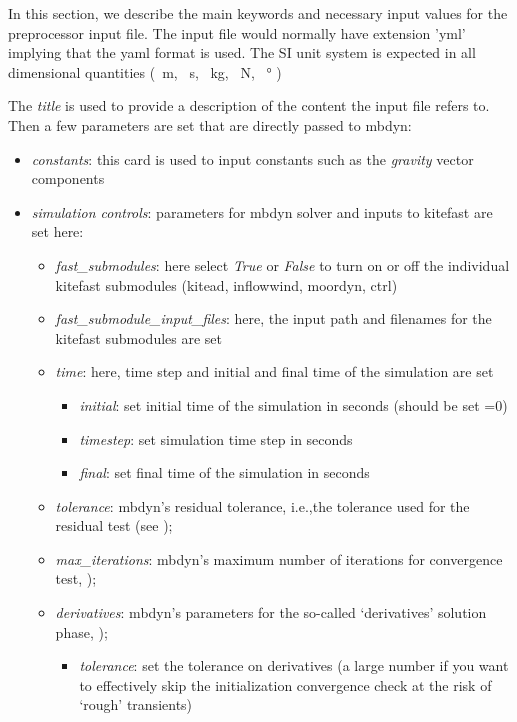 \documentclass[report]{nrel}
\def\ie{i.e., }
\def\ie{i.e.,}
\begin{document}
In this section, we describe the main keywords and necessary input values for the preprocessor input file. The input file would normally have extension 'yml' implying that the \gls{yaml} format is used. The SI unit system is expected in all dimensional quantities (\SI{}{\m}, \SI{}{\s}, \SI{}{\kg}, \SI{}{\N}, \SI{}{\degree} )

The \emph{title} is used to provide a description of the content the input file refers to.
Then a few parameters are set that are directly passed to \gls{mbdyn}:
\begin{itemize}
	\item \emph{constants}: this card is used to input constants such as the \emph{gravity} vector components
%	
	\item \emph{simulation controls}: parameters for \gls{mbdyn} solver and inputs to \gls{kitefast} are set here:
%
	\begin{itemize}
		\item \emph{fast\_submodules}: here select \emph{True} or \emph{False} to turn on or off the individual \gls{kitefast} submodules (\gls{kitead}, \gls{inflowwind}, \gls{moordyn}, \gls{ctrl})
		\item \emph{fast\_submodule\_input\_files}: here, the input path and filenames for the \gls{kitefast} submodules are set
		\item \emph{time}: here, time step and initial and final time of the simulation are set
		\begin{itemize}
			\item \emph{initial}: set initial time of the simulation in seconds (should be set =0)
			\item \emph{timestep}: set simulation time step in seconds
			\item \emph{final}: set final time of the simulation in seconds
		\end{itemize}
		\item \emph{tolerance}: \gls{mbdyn}'s residual tolerance, \ie the tolerance used for the residual test (see \cite{masarati2017});
		\item \emph{max\_iterations}: \gls{mbdyn}'s maximum number of iterations for convergence test, \citep[see][]{masarati2017});
		\item \emph{derivatives}: \gls{mbdyn}'s parameters for the so-called `derivatives' solution phase, \citep[see][]{masarati2017});
		\begin{itemize}
			\item \emph{tolerance}: set the tolerance on derivatives (a large number if you want to effectively skip the initialization convergence check at the risk of `rough' transients)

\end{itemize}
\end{itemize}
\end{itemize}
\end{document}
